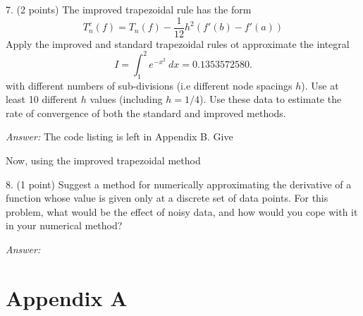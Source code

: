 \documentclass{article}
\newenvironment{answer}{\textit{Answer:}}{}
\begin{document}
7. (2 points) The improved trapezoidal rule has the form
\begin{equation*}
    T_n^c(f) = T_n(f) - \frac{1}{12}h^2(f'(b) - f'(a))
\end{equation*}
Apply the improved and standard trapezoidal rules ot approximate the integral
\begin{equation*}
    I = \int_1^2 e^{-x^2} \ dx = 0.1353572580.
\end{equation*}
with different numbers of sub-divisions (i.e different node spacings $h$).
Use at least 10 different $h$ values (including $h = 1/4$). Use these data to
estimate the rate of convergence of both the standard and improved methods.

\begin{answer}
    The code listing is left in Appendix B. Give
\end{answer}

Now, using the improved trapezoidal method

8. (1 point) Suggest a method for numerically approximating the derivative of
a function whose value is given only at a discrete set of data points.
For this problem, what would be the effect of noisy data, and how would you cope
with it in your numerical method?

\begin{answer}

\end{answer}

\section*{Appendix A}
\begin{lstlisting}[language=Python]
    
\end{lstlisting}
\end{document}
